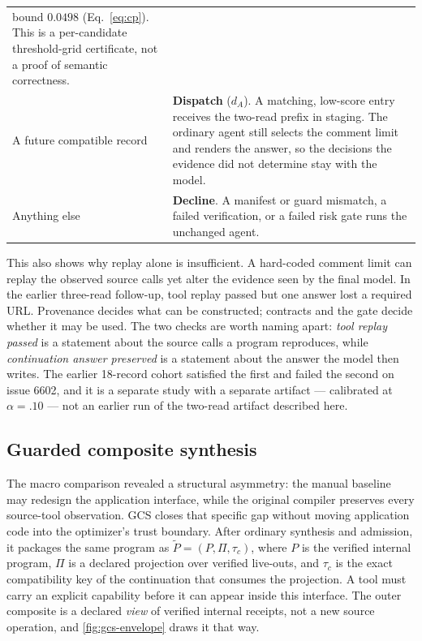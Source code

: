 \begin{table}[t]
\begin{tabularx}{\textwidth}{@{}p{}X@{}}
    bound $0.0498$ (Eq.~\eqref{eq:cp}).  This is a per-candidate threshold-grid certificate,
    not a proof of semantic correctness. \\
    \addlinespace[2pt]
    A future compatible record &
    \textbf{Dispatch} ($d_A$).  A matching, low-score entry receives the two-read prefix
    in staging.  The ordinary agent still selects the comment limit and renders the
    answer, so the decisions the evidence did not determine stay with the model. \\
    \addlinespace[2pt]
    Anything else &
    \textbf{Decline}.  A manifest or guard mismatch, a failed verification, or a failed
    risk gate runs the unchanged agent. \\
    \bottomrule
  \end{tabularx}
\end{table}

This also shows why replay alone is insufficient.  A hard-coded comment limit can replay
the observed source calls yet alter the evidence seen by the final model.  In the earlier
three-read follow-up, tool replay passed but one answer lost a required URL.  Provenance
decides what can be constructed; contracts and the gate decide whether it may be used.
The two checks are worth naming apart: \emph{tool replay passed} is a statement about the
source calls a program reproduces, while \emph{continuation answer preserved} is a
statement about the answer the model then writes.  The earlier 18-record cohort satisfied
the first and failed the second on issue 6602, and it is a separate study with a separate
artifact --- calibrated at $\alpha=.10$ --- not an earlier run of the two-read artifact
described here.

\subsection{Guarded composite synthesis}
\label{sec:gcs-method}

The macro comparison revealed a structural asymmetry: the manual baseline may redesign
the application interface, while the original compiler preserves every source-tool
observation.  GCS closes that specific gap without moving application code into the
optimizer's trust boundary.  After ordinary synthesis and admission, it packages the same
program as
\(\widetilde P=(P,\Pi,\tau_c)\), where \(P\) is the verified internal program,
\(\Pi\) is a declared projection over verified live-outs, and \(\tau_c\) is the exact
compatibility key of the continuation that consumes the projection.  A tool must carry an
explicit  capability before it can appear inside this interface.  The
outer composite is a declared \emph{view} of verified internal receipts, not a new source
operation, and \cref{fig:gcs-envelope} draws it that way.

